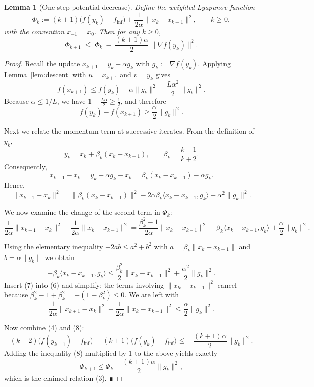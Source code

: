 \documentclass{article}
\newtheorem{lemma}{Lemma}
\begin{document}
\begin{lemma}[One‑step potential decrease]\label{lem:potential}
Define the weighted Lyapunov function
\[
\Phi_k := (k+1)\bigl(f(y_k)-f_{\inf}\bigr)
          +\frac{1}{2\alpha}\,\|x_k-x_{k-1}\|^2 ,\qquad k\ge 0,
\]
with the convention $x_{-1}=x_0$.
Then for any $k\ge 0$,
\[
\Phi_{k+1}
\;\le\;
\Phi_k
\;-\;
\frac{(k+1)\alpha}{2}\,\bigl\|\nabla f(y_k)\bigr\|^2 .
\tag{3}
\]
\end{lemma}
\begin{proof}
Recall the update $x_{k+1}=y_k-\alpha g_k$ with $g_k:=\nabla f(y_k)$.
Applying Lemma~\ref{lem:descent} with $u=x_{k+1}$ and $v=y_k$ gives
\[
f(x_{k+1})
\le
f(y_k)-\alpha\|g_k\|^2+\frac{L\alpha^{2}}{2}\|g_k\|^2 .
\]
Because $\alpha\le 1/L$, we have $1-\frac{L\alpha}{2}\ge\frac12$, and therefore
\[
f(y_k)-f(x_{k+1})\ge \frac{\alpha}{2}\|g_k\|^2 .
\tag{4}
\]

Next we relate the momentum term at successive iterates.
From the definition of $y_k$,
\[
y_k = x_k+\beta_k(x_k-x_{k-1}),\qquad
\beta_k=\frac{k-1}{k+2}.
\]
Consequently,
\[
x_{k+1}-x_k
= y_k-\alpha g_k-x_k
= \beta_k(x_k-x_{k-1})-\alpha g_k .
\]
Hence,
\[
\|x_{k+1}-x_k\|^2
= \|\beta_k(x_k-x_{k-1})\|^2
   -2\alpha\beta_k\langle x_k-x_{k-1},g_k\rangle
   +\alpha^{2}\|g_k\|^2 .
\tag{5}
\]

We now examine the change of the second term in $\Phi_k$:
\[
\frac{1}{2\alpha}\|x_{k+1}-x_k\|^2
-\frac{1}{2\alpha}\|x_k-x_{k-1}\|^2
= \frac{\beta_k^{2}-1}{2\alpha}\|x_k-x_{k-1}\|^2
   -\beta_k\langle x_k-x_{k-1},g_k\rangle
   +\frac{\alpha}{2}\|g_k\|^2 .
\tag{6}
\]

Using the elementary inequality $-2ab\le a^{2}+b^{2}$ with
$a=\beta_k\|x_k-x_{k-1}\|$ and $b=\alpha\|g_k\|$ we obtain
\[
-\beta_k\langle x_k-x_{k-1},g_k\rangle
\le
\frac{\beta_k^{2}}{2}\|x_k-x_{k-1}\|^2
   +\frac{\alpha^{2}}{2}\|g_k\|^2 .
\tag{7}
\]
Insert (7) into (6) and simplify; the terms involving $\|x_k-x_{k-1}\|^2$
cancel because $\beta_k^{2}-1+\beta_k^{2}=- (1-\beta_k^{2})\le0$.
We are left with
\[
\frac{1}{2\alpha}\|x_{k+1}-x_k\|^2
-\frac{1}{2\alpha}\|x_k-x_{k-1}\|^2
\le
\frac{\alpha}{2}\|g_k\|^2 .
\tag{8}
\]

Now combine (4) and (8):
\[
(k+2)\bigl(f(y_{k+1})-f_{\inf}\bigr)
-\,(k+1)\bigl(f(y_k)-f_{\inf}\bigr)
\le
-\,\frac{(k+1)\alpha}{2}\|g_k\|^2 .
\]
Adding the inequality (8) multiplied by $1$ to the above yields exactly
\[
\Phi_{k+1}\le\Phi_k-\frac{(k+1)\alpha}{2}\|g_k\|^2 ,
\]
which is the claimed relation (3). ∎
\end{proof}
\end{document}
